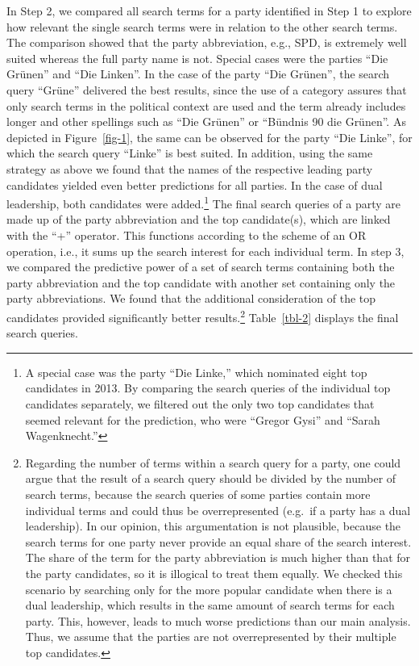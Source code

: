 \documentclass[
  letterpaper,
  DIV=11,
  numbers=noendperiod]{scrartcl}
\begin{document}
In Step 2, we compared all search terms for a party identified in Step 1
to explore how relevant the single search terms were in relation to the
other search terms. The comparison showed that the party abbreviation,
e.g., SPD, is extremely well suited whereas the full party name is not.
Special cases were the parties ``Die Grünen'' and ``Die Linken''. In the
case of the party ``Die Grünen'', the search query ``Grüne'' delivered
the best results, since the use of a category assures that only search
terms in the political context are used and the term already includes
longer and other spellings such as ``Die Grünen'' or ``Bündnis 90 die
Grünen''. As depicted in Figure~\ref{fig-1}, the same can be observed
for the party ``Die Linke'', for which the search query ``Linke'' is
best suited. In addition, using the same strategy as above we found that
the names of the respective leading party candidates yielded even better
predictions for all parties. In the case of dual leadership, both
candidates were added.\footnote{A special case was the party ``Die
  Linke,'' which nominated eight top candidates in 2013. By comparing
  the search queries of the individual top candidates separately, we
  ﬁltered out the only two top candidates that seemed relevant for the
  prediction, who were ``Gregor Gysi'' and ``Sarah Wagenknecht.''} The
ﬁnal search queries of a party are made up of the party abbreviation and
the top candidate(s), which are linked with the ``+'' operator. This
functions according to the scheme of an OR operation, i.e., it sums up
the search interest for each individual term. In step 3, we compared the
predictive power of a set of search terms containing both the party
abbreviation and the top candidate with another set containing only the
party abbreviations. We found that the additional consideration of the
top candidates provided signiﬁcantly better results.\footnote{Regarding
  the number of terms within a search query for a party, one could argue
  that the result of a search query should be divided by the number of
  search terms, because the search queries of some parties contain more
  individual terms and could thus be overrepresented (e.g.~if a party
  has a dual leadership). In our opinion, this argumentation is not
  plausible, because the search terms for one party never provide an
  equal share of the search interest. The share of the term for the
  party abbreviation is much higher than that for the party candidates,
  so it is illogical to treat them equally. We checked this scenario by
  searching only for the more popular candidate when there is a dual
  leadership, which results in the same amount of search terms for each
  party. This, however, leads to much worse predictions than our main
  analysis. Thus, we assume that the parties are not overrepresented by
  their multiple top candidates.} Table~\ref{tbl-2} displays the final
search queries.
\end{document}
